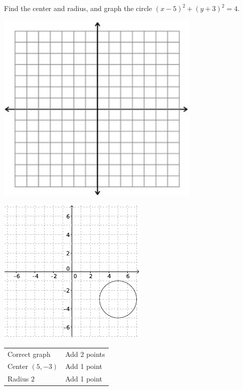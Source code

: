 {
	Find the center and radius, and graph the circle $(x-5)^2+(y+3)^2=4$.\begin{onlyproblem}\begin{center}\includegraphics{fig-graphpaper.png}\end{center}\end{onlyproblem} \begin{onlysolution}\begin{center}\includegraphics{fig100-20-c-answer}\end{center}\end{onlysolution}
}
{
	\begin{tabular}{l l}
	Correct graph & Add 2 points\\
	Center $(5, -3)$ & Add 1 point\\
	Radius $2$ & Add 1 point
	\end{tabular}
}

